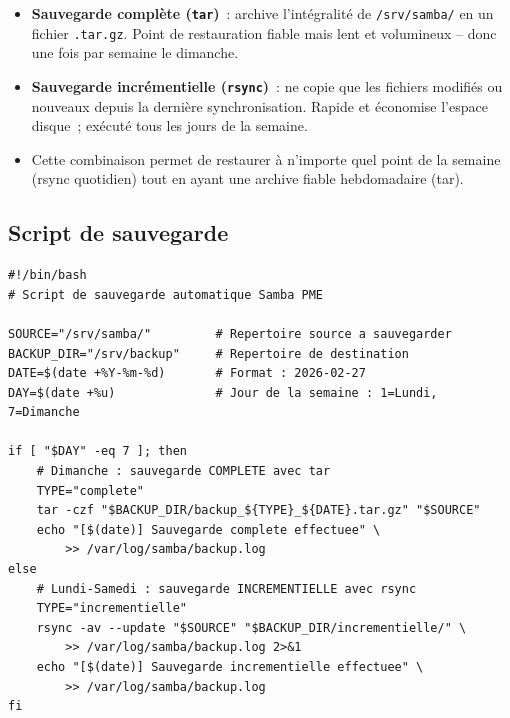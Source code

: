 \documentclass[12pt,a4paper]{article}
\begin{document}
\begin{explainbox}
\begin{itemize}[leftmargin=1.5em,topsep=2pt]
  \item \textbf{Sauvegarde complète (\texttt{tar})}~: archive l'intégralité de
    \texttt{/srv/samba/} en un fichier \texttt{.tar.gz}. Point de restauration fiable
    mais lent et volumineux -- donc une fois par semaine le dimanche.
  \item \textbf{Sauvegarde incrémentielle (\texttt{rsync})}~: ne copie que les fichiers
    modifiés ou nouveaux depuis la dernière synchronisation. Rapide et économise l'espace
    disque~; exécuté tous les jours de la semaine.
  \item Cette combinaison permet de restaurer à n'importe quel point de la semaine
    (rsync quotidien) tout en ayant une archive fiable hebdomadaire (tar).
\end{itemize}
\end{explainbox}

\subsection{Script de sauvegarde}

\begin{lstlisting}[style=config, caption={/usr/local/bin/backup\_samba.sh}]
#!/bin/bash
# Script de sauvegarde automatique Samba PME

SOURCE="/srv/samba/"         # Repertoire source a sauvegarder
BACKUP_DIR="/srv/backup"     # Repertoire de destination
DATE=$(date +%Y-%m-%d)       # Format : 2026-02-27
DAY=$(date +%u)              # Jour de la semaine : 1=Lundi, 7=Dimanche

if [ "$DAY" -eq 7 ]; then
    # Dimanche : sauvegarde COMPLETE avec tar
    TYPE="complete"
    tar -czf "$BACKUP_DIR/backup_${TYPE}_${DATE}.tar.gz" "$SOURCE"
    echo "[$(date)] Sauvegarde complete effectuee" \
        >> /var/log/samba/backup.log
else
    # Lundi-Samedi : sauvegarde INCREMENTIELLE avec rsync
    TYPE="incrementielle"
    rsync -av --update "$SOURCE" "$BACKUP_DIR/incrementielle/" \
        >> /var/log/samba/backup.log 2>&1
    echo "[$(date)] Sauvegarde incrementielle effectuee" \
        >> /var/log/samba/backup.log
fi
\end{lstlisting}
\end{document}

